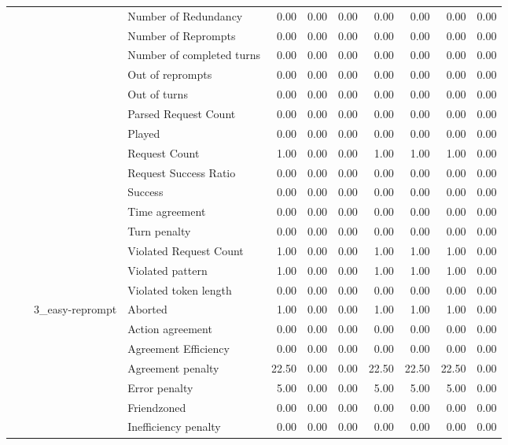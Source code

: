 \begin{tabular}{llllrrrrrrr}
 &  &  & Number of Redundancy & 0.00 & 0.00 & 0.00 & 0.00 & 0.00 & 0.00 & 0.00 \\
 &  &  & Number of Reprompts & 0.00 & 0.00 & 0.00 & 0.00 & 0.00 & 0.00 & 0.00 \\
 &  &  & Number of completed turns & 0.00 & 0.00 & 0.00 & 0.00 & 0.00 & 0.00 & 0.00 \\
 &  &  & Out of reprompts & 0.00 & 0.00 & 0.00 & 0.00 & 0.00 & 0.00 & 0.00 \\
 &  &  & Out of turns & 0.00 & 0.00 & 0.00 & 0.00 & 0.00 & 0.00 & 0.00 \\
 &  &  & Parsed Request Count & 0.00 & 0.00 & 0.00 & 0.00 & 0.00 & 0.00 & 0.00 \\
 &  &  & Played & 0.00 & 0.00 & 0.00 & 0.00 & 0.00 & 0.00 & 0.00 \\
 &  &  & Request Count & 1.00 & 0.00 & 0.00 & 1.00 & 1.00 & 1.00 & 0.00 \\
 &  &  & Request Success Ratio & 0.00 & 0.00 & 0.00 & 0.00 & 0.00 & 0.00 & 0.00 \\
 &  &  & Success & 0.00 & 0.00 & 0.00 & 0.00 & 0.00 & 0.00 & 0.00 \\
 &  &  & Time agreement & 0.00 & 0.00 & 0.00 & 0.00 & 0.00 & 0.00 & 0.00 \\
 &  &  & Turn penalty & 0.00 & 0.00 & 0.00 & 0.00 & 0.00 & 0.00 & 0.00 \\
 &  &  & Violated Request Count & 1.00 & 0.00 & 0.00 & 1.00 & 1.00 & 1.00 & 0.00 \\
 &  &  & Violated pattern & 1.00 & 0.00 & 0.00 & 1.00 & 1.00 & 1.00 & 0.00 \\
 &  &  & Violated token length & 0.00 & 0.00 & 0.00 & 0.00 & 0.00 & 0.00 & 0.00 \\
\cline{3-11}
 &  & \multirow[t]{27}{*}{3_easy-reprompt} & Aborted & 1.00 & 0.00 & 0.00 & 1.00 & 1.00 & 1.00 & 0.00 \\
 &  &  & Action agreement & 0.00 & 0.00 & 0.00 & 0.00 & 0.00 & 0.00 & 0.00 \\
 &  &  & Agreement Efficiency & 0.00 & 0.00 & 0.00 & 0.00 & 0.00 & 0.00 & 0.00 \\
 &  &  & Agreement penalty & 22.50 & 0.00 & 0.00 & 22.50 & 22.50 & 22.50 & 0.00 \\
 &  &  & Error penalty & 5.00 & 0.00 & 0.00 & 5.00 & 5.00 & 5.00 & 0.00 \\
 &  &  & Friendzoned & 0.00 & 0.00 & 0.00 & 0.00 & 0.00 & 0.00 & 0.00 \\
 &  &  & Inefficiency penalty & 0.00 & 0.00 & 0.00 & 0.00 & 0.00 & 0.00 & 0.00 \\

\end{tabular}
